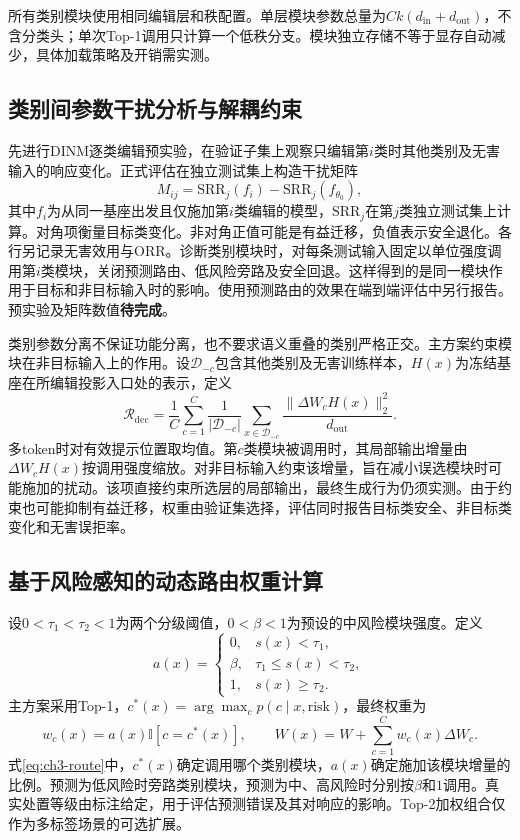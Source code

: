 所有类别模块使用相同编辑层和秩配置。单层模块参数总量为$Ck(d_{\mathrm{in}}+d_{\mathrm{out}})$，不含分类头；单次Top-1调用只计算一个低秩分支。模块独立存储不等于显存自动减少，具体加载策略及开销需实测。

\subsection{类别间参数干扰分析与解耦约束}

先进行DINM逐类编辑预实验，在验证子集上观察只编辑第$i$类时其他类别及无害输入的响应变化。正式评估在独立测试集上构造干扰矩阵
\begin{equation}
 M_{ij}=\mathrm{SRR}_j(f_i)-\mathrm{SRR}_j(f_{\theta_0}),
 \label{eq:ch3-interference}
\end{equation}
其中$f_i$为从同一基座出发且仅施加第$i$类编辑的模型，$\mathrm{SRR}_j$在第$j$类独立测试集上计算。对角项衡量目标类变化。非对角正值可能是有益迁移，负值表示安全退化。各行另记录无害效用与ORR。诊断类别模块时，对每条测试输入固定以单位强度调用第$i$类模块，关闭预测路由、低风险旁路及安全回退。这样得到的是同一模块作用于目标和非目标输入时的影响。使用预测路由的效果在端到端评估中另行报告。预实验及矩阵数值\textbf{待完成}。

类别参数分离不保证功能分离，也不要求语义重叠的类别严格正交。主方案约束模块在非目标输入上的作用。设$\mathcal D_{-c}$包含其他类别及无害训练样本，$H(x)$为冻结基座在所编辑投影入口处的表示，定义
\begin{equation}
 \mathcal R_{\mathrm{dec}}
 =\frac1C\sum_{c=1}^{C}\frac1{|\mathcal D_{-c}|}
 \sum_{x\in\mathcal D_{-c}}
 \frac{\|\Delta W_cH(x)\|_2^2}{d_{\mathrm{out}}}.
 \label{eq:ch3-decouple}
\end{equation}
多token时对有效提示位置取均值。第$c$类模块被调用时，其局部输出增量由$\Delta W_c H(x)$按调用强度缩放。对非目标输入约束该增量，旨在减小误选模块时可能施加的扰动。该项直接约束所选层的局部输出，最终生成行为仍须实测。由于约束也可能抑制有益迁移，权重由验证集选择，评估同时报告目标类安全、非目标类变化和无害误拒率。

\subsection{基于风险感知的动态路由权重计算}

设$0<\tau_1<\tau_2<1$为两个分级阈值，$0<\beta<1$为预设的中风险模块强度。定义
\begin{equation}
 a(x)=\begin{cases}
 0,&s(x)<\tau_1,\\
 \beta,&\tau_1\le s(x)<\tau_2,\\
 1,&s(x)\ge\tau_2.
 \end{cases}
 \label{eq:ch3-risk-gate}
\end{equation}
主方案采用Top-1，$c^*(x)=\arg\max_c p(c\mid x,\mathrm{risk})$，最终权重为
\begin{equation}
 w_c(x)=a(x)\mathbb I[c=c^*(x)],\qquad
 W(x)=W+\sum_{c=1}^{C}w_c(x)\Delta W_c.
 \label{eq:ch3-route}
\end{equation}
式\eqref{eq:ch3-route}中，$c^*(x)$确定调用哪个类别模块，$a(x)$确定施加该模块增量的比例。预测为低风险时旁路类别模块，预测为中、高风险时分别按$\beta$和$1$调用。真实处置等级由标注给定，用于评估预测错误及其对响应的影响。Top-2加权组合仅作为多标签场景的可选扩展。

